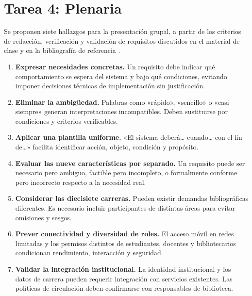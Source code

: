 \documentclass[conference,onecolumn]{IEEEtran}
\begin{document}
\section{Tarea 4: Plenaria}
Se proponen siete hallazgos para la presentación grupal, a partir de los criterios de redacción, verificación y validación de requisitos discutidos en el material de clase y en la bibliografía de referencia \cite{uteqsemana1,ieee29148,pohl2025}.

\begin{enumerate}
\item \textbf{Expresar necesidades concretas.} Un requisito debe indicar qué comportamiento se espera del sistema y bajo qué condiciones, evitando imponer decisiones técnicas de implementación sin justificación.
\item \textbf{Eliminar la ambigüedad.} Palabras como «rápido», «sencillo» o «casi siempre» generan interpretaciones incompatibles. Deben sustituirse por condiciones y criterios verificables.
\item \textbf{Aplicar una plantilla uniforme.} «El sistema deberá\ldots{} cuando\ldots{} con el fin de\ldots{}» facilita identificar acción, objeto, condición y propósito.
\item \textbf{Evaluar las nueve características por separado.} Un requisito puede ser necesario pero ambiguo, factible pero incompleto, o formalmente conforme pero incorrecto respecto a la necesidad real.
\item \textbf{Considerar las diecisiete carreras.} Pueden existir demandas bibliográficas diferentes. Es necesario incluir participantes de distintas áreas para evitar omisiones y sesgos.
\item \textbf{Prever conectividad y diversidad de roles.} El acceso móvil en redes limitadas y los permisos distintos de estudiantes, docentes y bibliotecarios condicionan rendimiento, interacción y seguridad.
\item \textbf{Validar la integración institucional.} La identidad institucional y los datos de carrera pueden requerir integración con servicios existentes. Las políticas de circulación deben confirmarse con responsables de biblioteca.
\end{enumerate}
\end{document}
